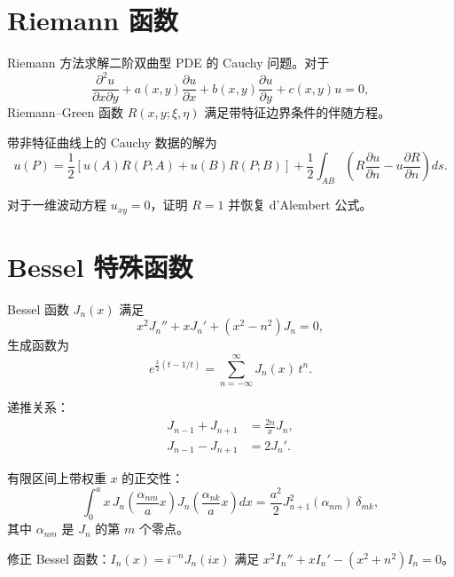 \section{Riemann 函数}

Riemann 方法求解二阶双曲型 PDE 的 Cauchy 问题。对于
\begin{equation}
\frac{\partial^2 u}{\partial x\partial y} + a(x,y)\frac{\partial u}{\partial x}
+ b(x,y)\frac{\partial u}{\partial y} + c(x,y)u = 0,
\label{eq:8.5.1}
\end{equation}
Riemann--Green 函数 $R(x,y;\xi,\eta)$ 满足带特征边界条件的伴随方程。

带非特征曲线上的 Cauchy 数据的解为
\begin{equation}
u(P) = \frac12\left[u(A)R(P;A)+u(B)R(P;B)\right]
+ \frac12\int_{AB}\left(R\frac{\partial u}{\partial n}-u\frac{\partial R}{\partial n}\right)ds.
\label{eq:8.5.2}
\end{equation}

\begin{exercise}
对于一维波动方程 $u_{xy}=0$，证明 $R=1$ 并恢复 d'Alembert 公式。
\end{exercise}

\section{Bessel 特殊函数}

Bessel 函数 $J_n(x)$ 满足
\begin{equation}
x^2J_n''+xJ_n'+(x^2-n^2)J_n=0,
\label{eq:8.6.1}
\end{equation}
生成函数为
\begin{equation}
e^{\frac{x}{2}(t-1/t)} = \sum_{n=-\infty}^{\infty} J_n(x)\,t^n.
\label{eq:8.6.2}
\end{equation}

递推关系：
\begin{align}
J_{n-1}+J_{n+1} &= \frac{2n}{x}J_n,\\
J_{n-1}-J_{n+1} &= 2J_n'.
\label{eq:8.6.3}
\end{align}

有限区间上带权重 $x$ 的正交性：
\begin{equation}
\int_0^a x\,J_n\!\left(\frac{\alpha_{nm}}{a}x\right)
J_n\!\left(\frac{\alpha_{nk}}{a}x\right)dx
= \frac{a^2}{2}J_{n+1}^2(\alpha_{nm})\,\delta_{mk},
\label{eq:8.6.4}
\end{equation}
其中 $\alpha_{nm}$ 是 $J_n$ 的第 $m$ 个零点。

修正 Bessel 函数：$I_n(x)=i^{-n}J_n(ix)$ 满足
$x^2I_n''+xI_n'-(x^2+n^2)I_n=0$。

